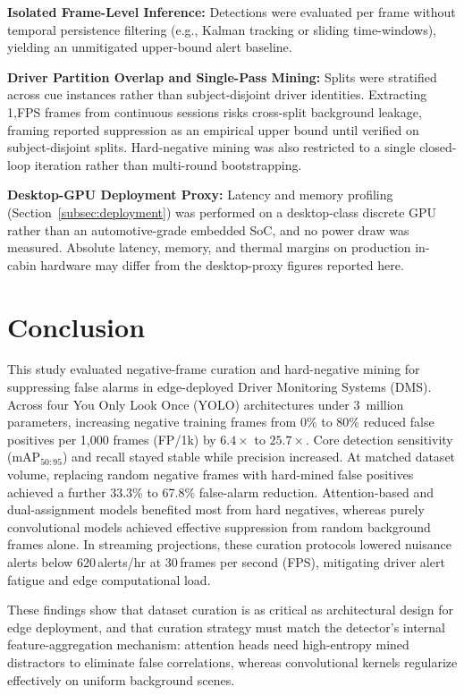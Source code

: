 \documentclass[conference]{IEEEtran}
\begin{document}
\textbf{Isolated Frame-Level Inference:} Detections were evaluated per frame without temporal persistence filtering (e.g., Kalman tracking or sliding time-windows), yielding an unmitigated upper-bound alert baseline.

\textbf{Driver Partition Overlap and Single-Pass Mining:} Splits were stratified across cue instances rather than subject-disjoint driver identities. Extracting 1,FPS frames from continuous sessions risks cross-split background leakage, framing reported suppression as an empirical upper bound until verified on subject-disjoint splits. Hard-negative mining was also restricted to a single closed-loop iteration rather than multi-round bootstrapping.

\textbf{Desktop-GPU Deployment Proxy:} Latency and memory profiling (Section~\ref{subsec:deployment}) was performed on a desktop-class discrete GPU rather than an automotive-grade embedded SoC, and no power draw was measured. Absolute latency, memory, and thermal margins on production in-cabin hardware may differ from the desktop-proxy figures reported here.

\section{Conclusion}
This study evaluated negative-frame curation and hard-negative mining for suppressing false alarms in edge-deployed Driver Monitoring Systems (DMS). Across four You Only Look Once (YOLO) architectures under 3~million parameters, increasing negative training frames from 0\% to 80\% reduced false positives per 1{,}000 frames (FP/1k) by $6.4\times$ to $25.7\times$. Core detection sensitivity ($\text{mAP}_{50:95}$) and recall stayed stable while precision increased. At matched dataset volume, replacing random negative frames with hard-mined false positives achieved a further 33.3\% to 67.8\% false-alarm reduction. Attention-based and dual-assignment models benefited most from hard negatives, whereas purely convolutional models achieved effective suppression from random background frames alone. In streaming projections, these curation protocols lowered nuisance alerts below 620\,alerts/hr at 30\,frames per second (FPS), mitigating driver alert fatigue and edge computational load.

These findings show that dataset curation is as critical as architectural design for edge deployment, and that curation strategy must match the detector's internal feature-aggregation mechanism: attention heads need high-entropy mined distractors to eliminate false correlations, whereas convolutional kernels regularize effectively on uniform background scenes.
\end{document}
